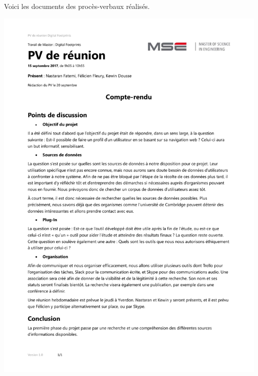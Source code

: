 Voici les documents des procès-verbaux réalisés.

\newpage

\includegraphics[width=1\textwidth]{images/annexes/pvs/DigFootprints_PV_15_09_2017}

